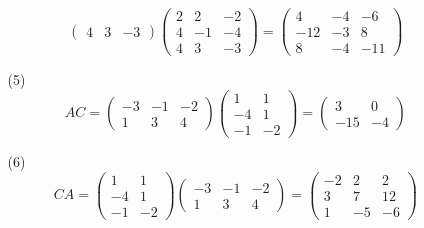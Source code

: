 \documentclass{article}
\begin{document}
\begin{enumerate}
\begin{enumerate}
\[\begin{pmatrix}
                    4& 3& -3
                \end{pmatrix}
                \begin{pmatrix}
                    2& 2& -2\\
                    4& -1& -4\\
                    4& 3& -3
                \end{pmatrix}
                =
                \begin{pmatrix}
                    4& -4& -6\\
                    -12& -3& 8\\
                    8& -4& -11
                \end{pmatrix}
            \]
            \item [(5)]
            \[
                AC=
                \begin{pmatrix}
                    -3& -1& -2\\
                    1& 3& 4 
                \end{pmatrix}
                \begin{pmatrix}
                    1& 1\\
                    -4& 1\\
                    -1& -2
                \end{pmatrix}
                =
                \begin{pmatrix}
                    3& 0\\
                    -15& -4
                \end{pmatrix}
            \]
            \item [(6)]
            \[
                CA=
                \begin{pmatrix}
                    1& 1\\
                    -4& 1\\
                    -1& -2
                \end{pmatrix}
                \begin{pmatrix}
                    -3& -1& -2\\
                    1& 3& 4 
                \end{pmatrix}
                =
                \begin{pmatrix}
                    -2& 2& 2\\
                    3& 7& 12\\
                    1& -5& -6
                \end{pmatrix}
\]
\end{enumerate}
\end{enumerate}
\end{document}
